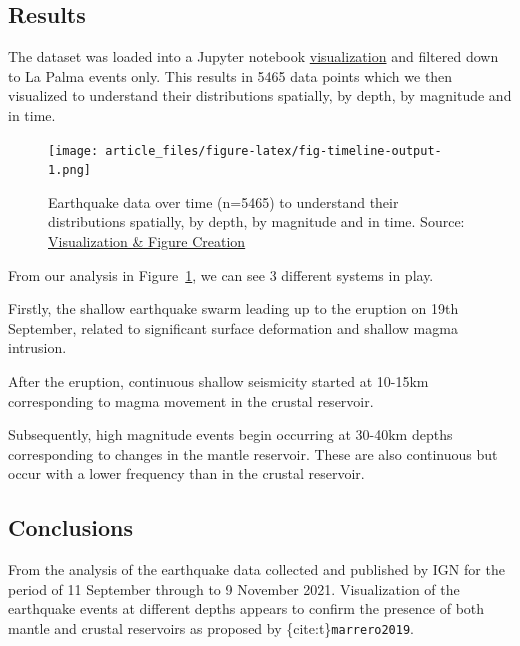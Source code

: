 \documentclass[
]{agujournal2019}
\begin{document}
\subsection{Results}\label{results}

The dataset was loaded into a Jupyter notebook
\href{./notebooks/visualization-figure-creation-seaborn.ipynb}{visualization}
and filtered down to La Palma events only. This results in 5465 data
points which we then visualized to understand their distributions
spatially, by depth, by magnitude and in time.

\begin{figure}[H]

{\centering \texttt{[image: article\_files/figure-latex/fig-timeline-output-1.png]}

}

\caption{\label{fig-timeline}Earthquake data over time (n=5465) to
understand their distributions spatially, by depth, by magnitude and in
time. Source:
\href{https://Notebooks-Now.github.io/submission-quarto-full/notebooks/visualization-figure-creation-seaborn-preview.html\#cell-fig-timeline}{Visualization
\& Figure Creation}}

\end{figure}

From our analysis in Figure~\ref{fig-timeline}, we can see 3 different
systems in play.

Firstly, the shallow earthquake swarm leading up to the eruption on 19th
September, related to significant surface deformation and shallow magma
intrusion.

After the eruption, continuous shallow seismicity started at 10-15km
corresponding to magma movement in the crustal reservoir.

Subsequently, high magnitude events begin occurring at 30-40km depths
corresponding to changes in the mantle reservoir. These are also
continuous but occur with a lower frequency than in the crustal
reservoir.

\subsection{Conclusions}\label{conclusions}

From the analysis of the earthquake data collected and published by IGN
for the period of 11 September through to 9 November 2021. Visualization
of the earthquake events at different depths appears to confirm the
presence of both mantle and crustal reservoirs as proposed by
\{cite:t\}\texttt{marrero2019}.
\end{document}
